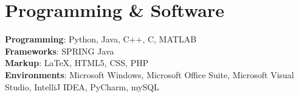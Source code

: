 \section{\sc Programming \& Software}
\textbf{Programming}: Python, Java, C++, C, MATLAB\\
\textbf{Frameworks}: SPRING Java\\
\textbf{Markup}: \LaTeX, HTML5, CSS, PHP\\
\textbf{Environments}: Microsoft Windows, Microsoft Office Suite, Microsoft Visual 
Studio, IntelliJ IDEA, PyCharm, mySQL